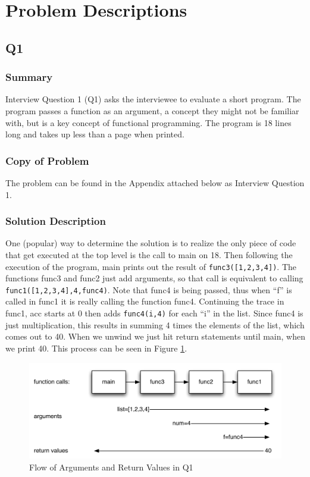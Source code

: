 \section{Problem Descriptions}


\subsection{Q1}
\subsubsection{Summary}
Interview Question 1 (Q1) asks the interviewee to evaluate a short program.
The program passes a function as an argument, a concept they might not be familiar with, but is a key concept of functional programming.
The program is 18 lines long and takes up less than a page when printed.
\subsubsection{Copy of Problem}
The problem can be found in the Appendix attached below as Interview Question 1.
\subsubsection{Solution Description}

One (popular) way to determine the solution is to realize the only piece of code that get executed at the top level is the call to main on 18.
Then following the execution of the program, main prints out the result of \texttt{func3([1,2,3,4])}.
The functions func3 and func2 just add arguments, so that call is equivalent to calling \texttt{func1([1,2,3,4],4,func4)}.
Note that func4 is being passed, thus when ``f'' is called in func1 it is really calling the function func4.
Continuing the trace in func1, acc starts at $0$ then adds \texttt{func4(i,4)} for each ``i'' in the list.
Since func4 is just multiplication, this results in summing 4 times the elements of the list, which comes out to 40.
When we unwind we just hit return statements until main, when we print 40. This process can be seen in Figure \ref{fig-q1}.

\begin{figure}[t]
\centering
\includegraphics[width=1.0\textwidth]{Q1diagram.pdf}
\caption{Flow of Arguments and Return Values in Q1}
\label{fig-q1}
\end{figure}
 
